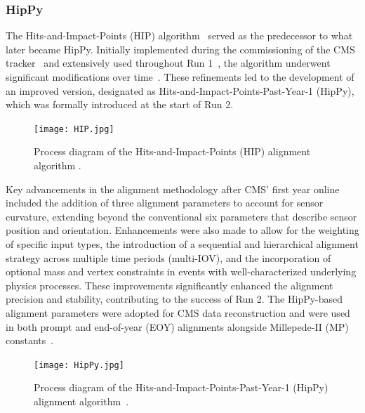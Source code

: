 
\subsubsection{HipPy}

The Hits-and-Impact-Points (HIP) algorithm~\cite{Karimaki:2003bd, Karimaki:926537} served as the predecessor to what later became HipPy. Initially implemented during the commissioning of the CMS tracker~\cite{WAdam_2009} and extensively used throughout Run 1~\cite{CMSCollaboration_2010, Chatrchyan:1667597}, the algorithm underwent significant modifications over time~\cite{BROWN2009467}. These refinements led to the development of an improved version, designated as Hits-and-Impact-Points-Past-Year-1 (HipPy), which was formally introduced at the start of Run 2. 

\begin{figure}[!htb]
    \begin{center}
        \texttt{[image: HIP.jpg]}
        \caption{Process diagram of the Hits-and-Impact-Points (HIP) alignment algorithm \cite{2022166795}.}
        \label{fig:HIP}
    \end{center}
\end{figure}

Key advancements in the alignment methodology after CMS' first year online included the addition of three alignment parameters to account for sensor curvature, extending beyond the conventional six parameters that describe sensor position and orientation. Enhancements were also made to allow for the weighting of specific input types, the introduction of a sequential and hierarchical alignment strategy across multiple time periods (multi-IOV), and the incorporation of optional mass and vertex constraints in events with well-characterized underlying physics processes. These improvements significantly enhanced the alignment precision and stability, contributing to the success of Run 2. The HipPy-based alignment parameters were adopted for CMS data reconstruction and were used in both prompt and end-of-year (EOY) alignments alongside Millepede-II (MP) constants~\cite{BROWN2009467}. 

\begin{figure}[!htb]
    \begin{center}
        \texttt{[image: HipPy.jpg]}
        \caption{Process diagram of the Hits-and-Impact-Points-Past-Year-1 (HipPy) alignment algorithm~\cite{2022166795}.}
        \label{fig:HipPy}
    \end{center}
\end{figure}

